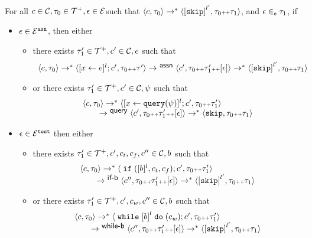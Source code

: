 \begin{lem}
\label{lem:inv_event}
For all $c\in \mathcal{C}, \mathtt{\tau}_0 \in \mathcal{T}^{+}, \mathtt{\epsilon} \in \mathcal{E}$such that 
$\config{c, \trace_0} \rightarrow^* \config{ \clabel{\eskip}^{l'}, \trace_0 \tracecat \trace_1}$, 
and $\mathtt{\epsilon} \in_{\mathtt{e}} \mathtt{\tau}_1$, if 
\begin{itemize}
	\item $\mathtt{\epsilon} \in \mathcal{E}^{\mathtt{{asn}}}$, then either
	\begin{itemize}
	 \item there exists $\mathtt{\tau}_1' \in \mathcal{T}^{+}, c' \in \mathcal{C}, e$ such that
\[
\begin{array}{l}
		\config{c, \trace_0} \rightarrow^* \config{ [\assign{x}{\expr}]^l;c', \trace_0  \tracecat  \trace'} 
		\rightarrow^\rname{assn}
		\config{c', \trace_0 \tracecat \trace_1'\tracecat [\event]} \rightarrow^{*}
		\config{ \clabel{\eskip}^{l'}, \trace_0  \tracecat  \trace_1}
\end{array}
\]
\item or there exists $\mathtt{\tau}_1' \in \mathcal{T}^{+}, c' \in \mathcal{C}, \psi$ such that 
\[
\begin{array}{l}
		\langle c, \mathtt{\tau}_0 \rangle \rightarrow^* \langle  [\mathrel{ x \leftarrow {\tt query}(\psi) }]^l;c', \mathtt{\tau}_0 {\scriptscriptstyle ++} \mathtt{\tau}_1' \rangle 
		\\ \qquad
		\rightarrow^{\textsf{\small{ query}}}
		\langle c', \mathtt{\tau}_0  {\scriptscriptstyle ++}  \mathtt{\tau}_1' {\scriptscriptstyle ++} [\mathtt{\epsilon}]  \rangle \rightarrow^{*}
		\langle  \mathtt{skip}, \mathtt{\tau}_0 {\scriptscriptstyle ++} \mathtt{\tau}_1 \rangle
\end{array}
\]
\end{itemize}

\item $\mathtt{\epsilon}\in \mathcal{E}^{\mathtt{{test}}}$ then either 
\begin{itemize}
\item there exists $\mathtt{\tau}_1' \in \mathcal{T}^{+}, c', c_t, c_f, c'' \in \mathcal{C}, b$ such that
\[
\begin{array}{l}
		\config{c, \trace_0} \rightarrow^* \config{\eif ([b]^l, c_t, c_f);c', \trace_0 \tracecat \trace_1'} 
		\\ \qquad
		\rightarrow^\rname{if-b}
		\config{c'', \trace_0 \tracecat \trace_1'\tracecat [\event] } \rightarrow^{*}
		\config{ \clabel{\eskip}^{l'}, \trace_0 \tracecat \trace_1} 
\end{array}
\]
\item or there exists $ \mathtt{\tau}_1' \in \mathcal{T}^{+}, c', c_w, c'' \in \mathcal{C}, b$ such that 
\[
	\begin{array}{l}
		\config{c, \trace_0} \rightarrow^* \config{ \ewhile \clabel{b}^l \edo (c_w);c', \trace_0 \tracecat  \trace_1'} 
		\\ \qquad
		\rightarrow^\rname{while-b}
		\config{c'', \trace_0 \tracecat \trace_1'\tracecat [\event] } \rightarrow^{*}
		\config{ \clabel{\eskip}^{l'}, \trace_0  \tracecat \trace_1}
\end{array}
\]
\end{itemize}
\end{itemize}
%
\end{lem}

